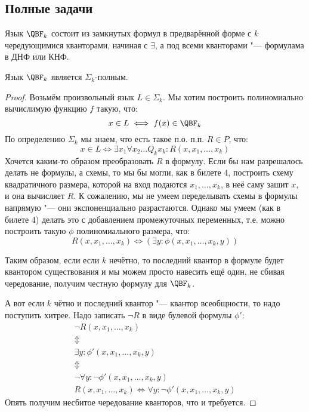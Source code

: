 \subsection{Полные задачи}
	\begin{Def}
		Язык $\QBF_k$ состоит из замкнутых формул в предварённой форме с $k$ чередующимися кванторами, начиная с $\exists$,
		а под всеми кванторами "--- формулама в ДНФ или КНФ.
	\end{Def}
	\begin{assertion}
		Язык $\QBF_k$ является $\Sigma_k$-полным.
	\end{assertion}
	\begin{proof}
		Возьмём произвольный язык $L \in \Sigma_k$.
		Мы хотим построить полиномиально вычислимую функцию $f$ такую, что:
		\[ x \in L \iff f(x) \in \QBF_k \]
		По определению $\Sigma_k$ мы знаем, что есть такое п.о. п.п. $R \in P$, что:
		\[ x \in L \iff \exists x_1 \forall x_2 \dots Q_k x_k \colon R(x, x_1, \dots, x_k) \]
		Хочется каким-то образом преобразовать $R$ в формулу.
		Если бы нам разрешалось делать не формулы, а схемы, то мы бы могли, как в билете 4, построить схему квадратичного размера,
		которой на вход подаются $x_1, \dots, x_k$, в неё саму зашит $x$, и она вычисляет $R$.
		К сожалению, мы не умеем переделывать схемы в формулы напрямую "--- они экспоненциально разрастаются.
		Однако мы умеем (как в билете 4) делать это с добавлением промежуточных переменных, т.е. можно построить такую $\phi$ полиномиального размера, что:
		\[ R(x, x_1, \dots, x_k) \iff (\exists y \colon \phi(x, x_1, \dots, x_k, y)) \]

		Таким образом, если если $k$ нечётно, то последний квантор в формуле будет квантором существования и мы можем просто навесить ещё один,
		не сбивая чередование, получим честную формулу для $\QBF_k$.

		А вот если $k$ чётно и последний квантор "--- квантор всеобщности, то надо поступить хитрее.
		Надо записать $\lnot R$ в виде булевой формулы $\phi'$:
		\begin{gather*}
			\lnot R(x, x_1, \dots, x_k) \\
			\Updownarrow \\
			\exists y \colon \phi'(x, x_1, \dots, x_k, y) \\
			\Updownarrow \\
			\lnot \forall y \colon \lnot \phi'(x, x_1, \dots, x_k, y) \\
			R(x, x_1, \dots, x_k) \iff \forall y \colon \lnot \phi'(x, x_1, \dots, x_k, y)
		\end{gather*}
		Опять получим несбитое чередование кванторов, что и требуется.
	\end{proof}

